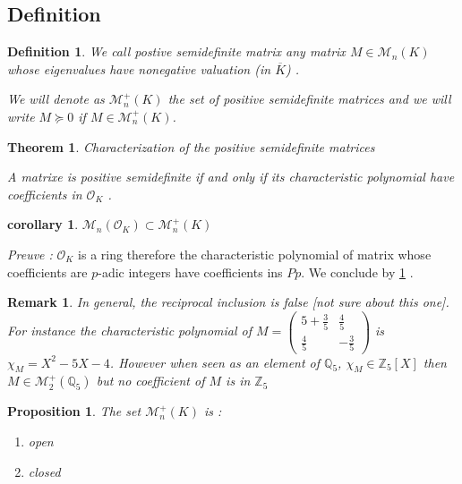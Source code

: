 \documentclass[a4paper,12pt]{article}
\newtheorem{theorem}{Theorem}
\newtheorem{proposition}{Proposition}
\newtheorem{corollary}{corollary}
\newtheorem{definition}{Definition}
\newtheorem{remark}{Remark}
\newcommand{\OK}{\mathcal{O}_K}
\begin{document}
\subsection{Definition}
\newcommand\mat{postive semidefinite matrix } 
\newcommand\Mat{Positive semidefinite matrix }
\newcommand\mats{positive semidefinite matrices }
\newcommand\Mats{positive semidefinite matrices }
\begin{definition}
	We call {\it \mat} any matrix $M \in \mathcal{M}_n\left( K \right) $ whose eigenvalues have nonegative valuation (in $\overline{K}$) .
	
	We will denote as $ \mathcal{M}_n^+\left( K \right)$ the set of \mats and we will write $M \succeq 0$ if $M \in \mathcal{M}_n^+\left( K\right) $.
\end{definition}
\begin{theorem}
	\label{caracsdp}
	Characterization of the \mats
	
	A matrixe is positive semidefinite if and only if its characteristic polynomial have coefficients in $\OK$ .
	
\end{theorem}


\begin{corollary}
	$\mathcal{M}_n(\OK) \subset \mathcal{M}_n^+\left( K \right)$ 
\end{corollary}


\textit{Preuve : }  $\OK$ is a ring therefore the characteristic polynomial of matrix whose coefficients are $p$-adic integers have coefficients ins $Pp$. We conclude by \ref{caracsdp} .


\begin{remark}
	In general, the reciprocal inclusion is false [not sure about this one]. For instance the characteristic polynomial of $M = \begin{pmatrix} 5 + \frac{3}{5} & \frac{4}{5} \\ \frac{4}{5} & -\frac{3}{5} \end{pmatrix} $ is $\chi_M = X^2  - 5 X - 4$. However when seen as an element of $\mathbb{Q}_5$, $\chi_M \in \mathbb{Z}_5[X]$ then $M \in \mathcal{M}_2^+\left( \mathbb{Q}_5 \right)$ but no coefficient of $M$ is in $\mathbb{Z}_5 $
\end{remark}

\begin{proposition}
	The set $\mathcal{M}_n^+\left( K \right)$ is :
	\begin{enumerate}%
		\item open
		\item closed
	\end{enumerate}
\end{proposition}
\end{document}
